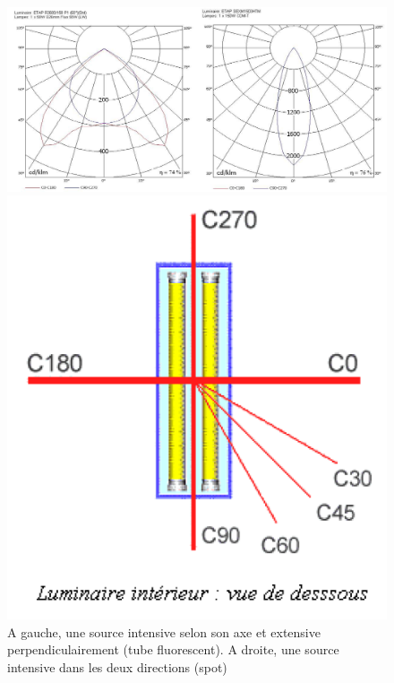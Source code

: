\documentclass[11pt]{report}
\begin{document}
\begin{figure}[h]
\begin{minipage}{0.7\linewidth}
\centering
\includegraphics[width=\linewidth]{polaire}
\end{minipage}
\begin{minipage}{0.28\linewidth}
\centering
\includegraphics[width=\linewidth]{diagcd}
\end{minipage}
\caption{A gauche, une source intensive selon son axe et extensive perpendiculairement (tube fluorescent). A droite, une source intensive dans les deux directions (spot)}
\end{figure}
\end{document}
